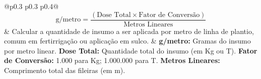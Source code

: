 \documentclass[a4paper, 12pt]{article}
\begin{document}
\begin{longtable}{@{}p{} p{} p{}@{}}
 \\
\cmidrule(r){1-3}
$$ \text{g/metro} = \frac{(\text{Dose Total} \times \text{Fator de Conversão})}{\text{Metros Lineares}} $$ &
Calcular a quantidade de insumo a ser aplicada por metro de linha de plantio, comum em fertirrigação ou aplicação em sulco. &
\textbf{g/metro:} Gramas do insumo por metro linear. \newline
\textbf{Dose Total:} Quantidade total do insumo (em Kg ou T). \newline
\textbf{Fator de Conversão:} 1.000 para Kg; 1.000.000 para T. \newline
\textbf{Metros Lineares:} Comprimento total das fileiras (em m). \\

\end{longtable}
\end{document}
